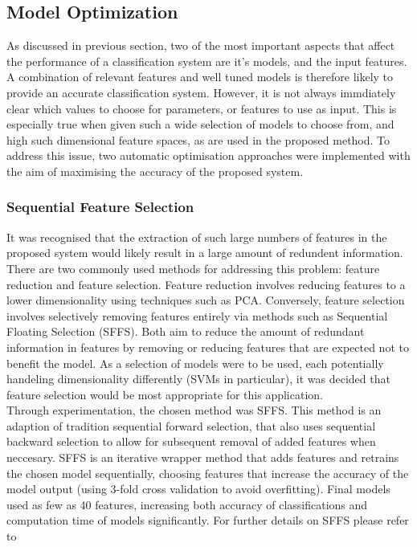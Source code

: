 \documentclass[titlepage, 12pt]{scrartcl} \usepackage{enumitem}
\begin{document}

\subsection{Model Optimization}\label{optimise}
As discussed in previous section, two of the most important aspects that affect
the performance of a classification system are it's models, and the input
features. A combination of relevant features and well tuned models is therefore
likely to provide an accurate classification system. However, it is not always
immdiately clear which values to choose for parameters, or features to use as
input. This is especially true when given such a wide selection of models to
choose from, and high such dimensional feature spaces, as are used in the
proposed method. To address this issue, two automatic optimisation approaches
were implemented with the aim of maximising the accuracy of the proposed
system. 

\subsubsection{Sequential Feature Selection}\label{SFS}
It was recognised that the extraction of such large numbers of features in the
proposed system would likely result in a large amount of redundent information.
There are two commonly used methods for addressing this problem: feature
reduction and feature selection. Feature reduction involves reducing features
to a lower dimensionality using techniques such as PCA. Conversely, feature
selection involves selectively removing features entirely via methods such as
Sequential Floating Selection (SFFS). Both aim to reduce the amount of redundant
information in features by removing or reducing features that are expected not
to benefit the model. As a selection of models were to be used, each
potentially handeling dimensionality differently (SVMs in particular), it was
decided that feature selection would be most appropriate for this application.\\

Through experimentation, the chosen method was SFFS. This method is an adaption
of tradition sequential forward selection, that also uses sequential backward
selection to allow for subsequent removal of added features when neccesary.
SFFS is an iterative wrapper method that adds features and retrains the chosen
model sequentially, choosing features that increase the accuracy of the model
output (using 3-fold cross validation to avoid overfitting). Final models used
as few as 40 features, increasing both accuracy of classifications and
computation time of models significantly. For further details on SFFS please
refer to~\parencite[p.3]{Ferri1994}
\end{document}
